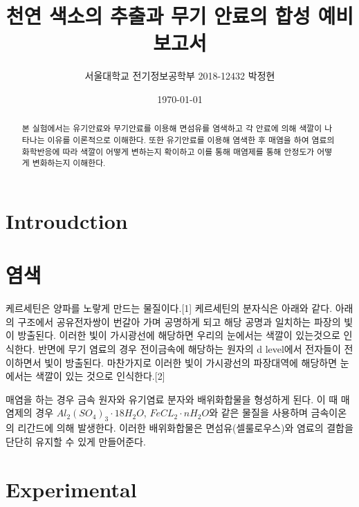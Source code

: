 \documentclass[%
 reprint,
 amsmath,amssymb,
 aps,
]{revtex4-2}
\begin{document}
\title{천연 색소의 추출과 무기 안료의 합성 예비보고서}

\author{서울대학교 전기정보공학부 2018-12432 박정현}
\date{\today}%

\begin{abstract}
본 실험에서는 유기안료와 무기안료를 이용해 면섬유를 염색하고 각 안료에 의해 색깔이 나타나는 이유를 이론적으로 이해한다. 또한 유기안료를 이용해 염색한 후 매염을 하여 염료의 화학반응에 따라 색깔이 어떻게 변하는지 확이하고 이를 통해 매염제를 통해 안정도가 어떻게 변화하는지 이해한다.
\end{abstract}

\maketitle


\section{\label{sec:level1}Introudction}
\section{\label{sec:level2}염색}
케르세틴은 양파를 노랗게 만드는 물질이다.[1] 케르세틴의 분자식은 아래와 같다. 아래의 구조에서 공유전자쌍이 번갈아 가며 공명하게 되고 해당 공명과 일치하는 파장의 빛이 방출된다. 이러한 빛이 가시광선에 해당하면 우리의 눈에서는 색깔이 있는것으로 인식한다. 반면에 무기 염료의 경우 전이금속에 해당하는 원자의 d level에서 전자들이 전이하면서 빛이 방출된다. 마찬가지로 이러한 빛이 가시광선의 파장대역에 해당하면 눈에서는 색깔이 있는 것으로 인식한다.[2]

매염을 하는 경우 금속 원자와 유기염료 분자와 배위화합물을 형성하게 된다. 이 때 매염제의 경우 $Al_{2}(SO_{4})_{3}\cdot18H_{2}O$, $FeCL_{2}\cdot nH_{2}O$와 같은 물질을 사용하며 금속이온의 리간드에 의해 발생한다. 이러한 배위화합물은 면섬유(셀룰로우스)와 염료의 결합을 단단히 유지할 수 있게 만들어준다.

\section{\label{sec:level1}Experimental}
\end{document}
